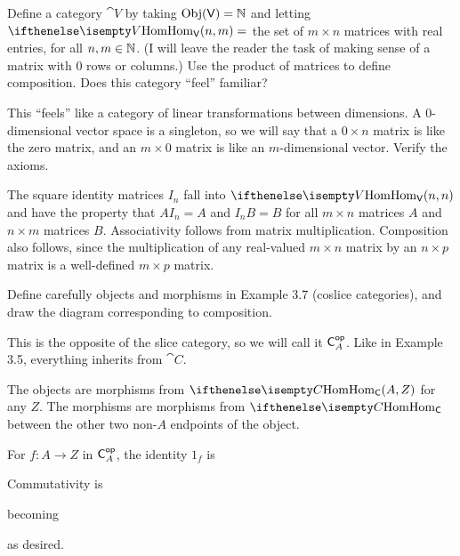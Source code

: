 \documentclass[notes,tikz]{agony}
\begin{document}
\begin{xca}
  Define a category $\cat V$ by taking $\operatorname{Obj}(\mathsf{V}) = \mathbb{N}$
  and letting $\Hom[V](n, m) =$ the set of $m \times n$ matrices with real entries,
  for all $n,m \in \mathbb{N}$.
  (I will leave the reader the task of making sense of a matrix with 0 rows or columns.)
  Use the product of matrices to define composition.
  Does this category ``feel'' familiar?
\end{xca}
\begin{sol}
  This ``feels'' like a category of linear transformations between dimensions.
  A 0-dimensional vector space is a singleton, so we will say that a $0 \times n$
  matrix is like the zero matrix, and an $m \times 0$ matrix is like an $m$-dimensional vector.
  Verify the axioms.

  The square identity matrices $I_n$ fall into $\Hom[V](n,n)$
  and have the property that $A I_n = A$ and $I_n B = B$ for all $m \times n$ matrices $A$
  and $n \times m$ matrices $B$.
  Associativity follows from matrix multiplication.
  Composition also follows, since the multiplication
  of any real-valued $m \times n$ matrix by an $n \times p$ matrix
  is a well-defined $m \times p$ matrix.
\end{sol}

\begin{xca}
  Define carefully objects and morphisms in Example 3.7 (coslice categories),
  and draw the diagram corresponding to composition.
\end{xca}
\begin{sol}
  This is the opposite of the slice category, so we will call it $\mathsf{C}^{\mathsf{op}}_A$.
  Like in Example 3.5, everything inherits from $\cat C$.

  The objects are morphisms from $\Hom[C](A,Z)$ for any $Z$.
  The morphisms are morphisms from $\Hom[C]$ between the other two non-$A$ endpoints of the object.

  For $f : A \to Z$ in $\mathsf{C}^{\mathsf{op}}_A$, the identity $1_f$ is

  Commutativity is
  becoming
  as desired.
\end{sol}
\end{document}
